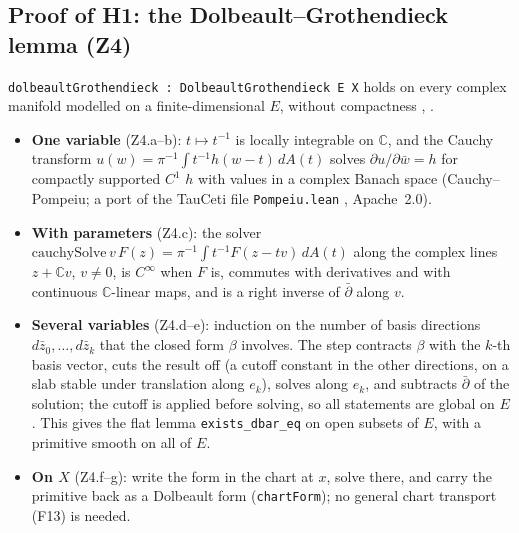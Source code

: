 \documentclass[11pt,a4paper]{article}
\newcommand{\code}[1]{\texttt{#1}}
\newcommand{\dbar}{\bar\partial}
\begin{document}
\subsection{Proof of H1: the Dolbeault--Grothendieck lemma (Z4)}\label{sec:h1}
\code{dolbeaultGrothendieck : DolbeaultGrothendieck E X} holds on every complex manifold modelled
on a finite-dimensional $E$, without compactness \cite[Thm~2.3.3]{Hor}, \cite[p.~25]{GH}.
\begin{itemize}
\item \textbf{One variable} (Z4.a--b): $t\mapsto t^{-1}$ is locally integrable on $\mathbb C$, and the
Cauchy transform $u(w)=\pi^{-1}\int t^{-1}h(w-t)\,dA(t)$ solves $\partial u/\partial\bar w=h$ for
compactly supported $C^1$ $h$ with values in a complex Banach space (Cauchy--Pompeiu; a port of
the TauCeti file \code{Pompeiu.lean} \cite{TauCeti}, Apache~2.0).
\item \textbf{With parameters} (Z4.c): the solver
$\mathrm{cauchySolve}\,v\,F(z)=\pi^{-1}\int t^{-1}F(z-tv)\,dA(t)$ along the complex lines $z+\mathbb Cv$,
$v\ne0$, is $C^\infty$ when $F$ is, commutes with derivatives and with continuous
$\mathbb C$-linear maps, and is a right inverse of $\dbar$ along $v$.
\item \textbf{Several variables} (Z4.d--e): induction on the number of basis directions
$d\bar z_0,\dots,d\bar z_k$ that the closed form $\beta$ involves. The step contracts $\beta$ with
the $k$-th basis vector, cuts the result off (a cutoff constant in the other directions, on a slab
stable under translation along $e_k$), solves along $e_k$, and subtracts $\dbar$ of the solution;
the cutoff is applied before solving, so all statements are global on $E$. This gives the flat
lemma \code{exists\_dbar\_eq} on open subsets of $E$, with a primitive smooth on all of $E$.
\item \textbf{On $X$} (Z4.f--g): write the form in the chart at $x$, solve there, and carry the
primitive back as a Dolbeault form (\code{chartForm}); no general chart transport (F13) is needed.
\end{itemize}
\end{document}

